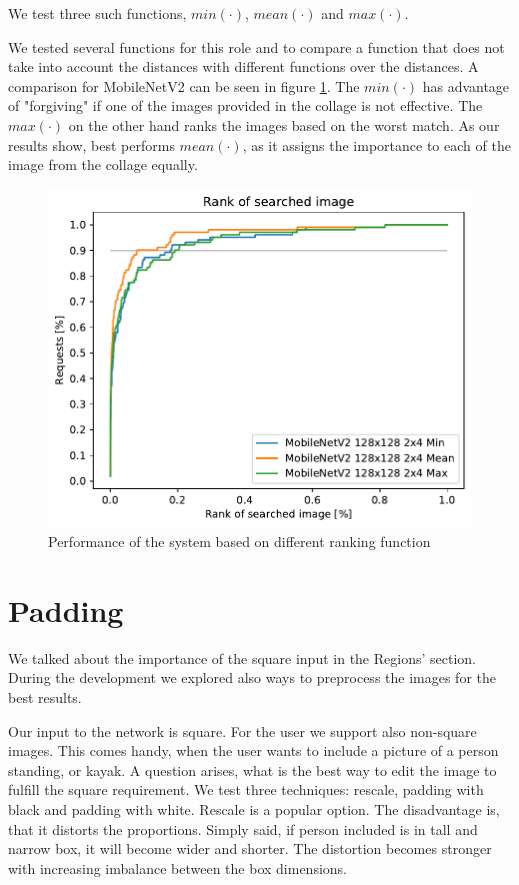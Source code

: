 We test three such functions, $min(\cdot)$, $mean(\cdot)$ and $max(\cdot)$. 

We tested several functions for this role and to compare a function that does not take into account the distances with different functions over the distances. A comparison for MobileNetV2 can be seen in figure \ref{fig:ranking_funcs}. The $min(\cdot)$ has advantage of "forgiving" if one of the images provided in the collage is not effective. The $max(\cdot)$ on the other hand ranks the images based on the worst match. As our results show, best performs $mean(\cdot)$, as it assigns the importance to each of the image from the collage equally.

\begin{figure}
\centering
\includegraphics[width=\textwidth]{graphs/70c56dc52be92e048f57b9bdfb35ddce2be41fd2454ae360588da2e387b09de5.pdf}
\caption{Performance of the system based on different ranking function}
\label{fig:ranking_funcs}
\end{figure}

\section{Padding}

We talked about the importance of the square input in the Regions' section. During the development we explored also ways to preprocess the images for the best results.

Our input to the network is square. For the user we support also non-square images. This comes handy, when the user wants to include a picture of a person standing, or kayak. A question arises, what is the best way to edit the image to fulfill the square requirement. We test three techniques: rescale, padding with black and padding with white. Rescale is a popular option. The disadvantage is, that it distorts the proportions. Simply said, if person included is in tall and narrow box, it will become wider and shorter. The distortion becomes stronger with increasing imbalance between the box dimensions. 

